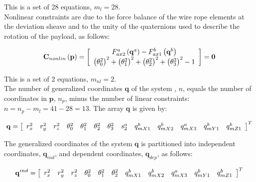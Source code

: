 \setlength{\parindent}{0cm}
This is a set of 28 equations, $m_l = 28$.\\     

Nonlinear constraints are due to the force balance of the wire rope elements at the deviation sheave and to the unity of the quaternions used to describe the rotation of the payload, as follows: 

\begin{equation} 
{{\bf{C}}_{nonlin}}\left( {\bf{p}} \right) = \left[ {\begin{array}{*{20}{c}}
{F_{ax2}^a\left( {{{\bf{q}}^a}} \right) - F_{ax1}^b\left( {{{\bf{q}}^b}} \right)}\\
{{{\left( {\theta _0^2} \right)}^2} + {{\left( {\theta _1^2} \right)}^2} + {{\left( {\theta _2^2} \right)}^2} + {{\left( {\theta _3^2} \right)}^2} - 1}
\end{array}} \right] = {\bf{0}}
\label{WRnl}
\end{equation}

\setlength{\parindent}{0cm}
This is a set of 2 equations, $m_{nl} = 2$.\\

The number of generalized coordinates $\textbf{q}$ of the system , $n$, equals the number of coordinates in $\textbf{p}$, $n_p$, minus the number of linear constraints: $n = {n_p} - {m_l} = 41 - 28 = 13$.
The array $\textbf{q}$ is given by:

\begin{equation} \label{setq_Elev}
{\bf{q}} = {\left[ {\begin{array}{*{20}{c}}
{r_x^2}&{r_y^2}&{r_z^2}&{\theta _0^2}&{\theta _1^2}&{\theta _2^2}&{\theta _3^2}&{s_2^a}&{q_{mX1}^b}&{q_{mX2}^b}&{q_{mX3}^a}&{q_{mY1}^b}&{q_{mZ1}^b}
\end{array}} \right]^T}
\end{equation}

The generalized coordinates of the system $\textbf{q}$ is partitioned into independent coordinates, $\textbf{q}_{ind}$, and dependent coordinates, $\textbf{q}_{dep}$, as follows: 

\begin{equation} \label{subsetsq_Elev}
{{\bf{q}}^{ind}} = {\left[ {\begin{array}{*{20}{c}}
{r_x^2}&{r_y^2}&{r_z^2}&{\theta _0^2}&{\theta _1^2}&{\theta _2^2}&{q_{mX1}^b}&{q_{mX2}^b}&{q_{mX3}^a}&{q_{mY1}^b}&{q_{mZ1}^b}
\end{array}} \right]^T}
\end{equation}

